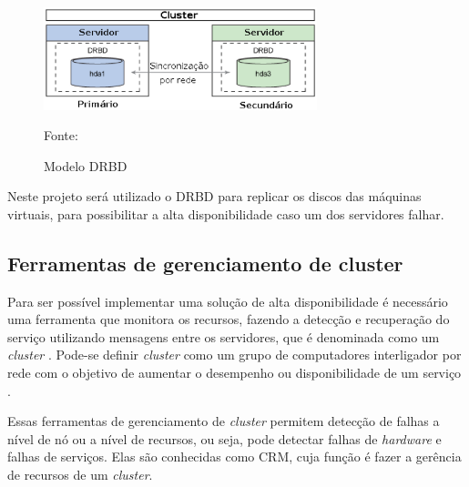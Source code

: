 \begin{figure}[h!]
 \centering
 \includegraphics[width=300px]{img/drbd_basic.eps}
 \caption{Modelo DRBD}
 Fonte: \citet{jones2010}
 \label{fig:drbd_basic}
\end{figure}

Neste projeto será utilizado o \ac{DRBD} para replicar os discos das máquinas virtuais, para possibilitar a alta disponibilidade caso um 
dos servidores falhar.


\subsection{Ferramentas de gerenciamento de cluster}
\label{section:toolcluster}

Para ser possível implementar uma solução de alta disponibilidade é necessário uma ferramenta que monitora os recursos, fazendo a detecção e
recuperação do serviço utilizando mensagens entre os servidores, que é denominada como um \textit{cluster} \cite{perkov2011}. 
Pode-se definir \textit{cluster} como um grupo de computadores interligador por rede com o objetivo de aumentar o desempenho ou disponibilidade
de um serviço \cite{freitas2005}.

Essas ferramentas de gerenciamento de \textit{cluster} permitem detecção de falhas a nível de nó ou a nível de recursos, ou seja, pode detectar
falhas de \textit{hardware} e falhas de serviços. Elas são conhecidas como \ac{CRM}, cuja função é fazer a gerência de recursos de um 
\textit{cluster}.

